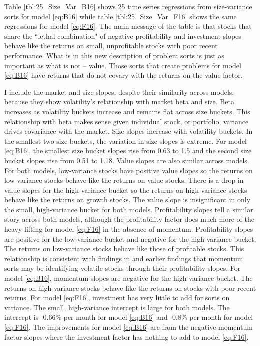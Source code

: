 
Table \ref{tbl:25_Size_Var_B16} shows 25 time series regressions from
size-variance sorts for model \ref{eq:B16} while table
\ref{tbl:25_Size_Var_F16} shows the same regressions for model \ref{eq:F16}.
The main message of the table is that stocks that share the
``lethal combination" of negative profitability and investment slopes behave
like the returns on small, unprofitable stocks with poor recent performance.
What is in this new description of problem sorts is just as important as what
is not -- value.
Those sorts that create problems for model \ref{eq:B16} have returns that do
not covary with the returns on the value factor.

I include the market and size slopes, despite their similarity across models,
because they show volatility's relationship with market beta and size.
Beta increases as volatility buckets increase and remains flat across size
buckets.
This relationship with beta makes sense given individual stock, or portfolio,
variance drives covariance with the market.
Size slopes increase with volatility buckets.
In the smallest two size buckets, the variation in size slopes is extreme.
For model \ref{eq:B16}, the smallest size bucket slopes rise from 0.63 to 1.5
and the second size bucket slopes rise from 0.51 to 1.18.
Value slopes are also similar across models.
For both models, low-variance stocks have positive value slopes so
the returns on low-variance stocks behave like the returns on value stocks.
There is a drop in value slopes for the high-variance bucket so
the returns on high-variance stocks behave like the returns on growth stocks.
The value slope is insignificant in only the small, high-variance bucket for
both models.
Profitability slopes tell a similar story across both models,
although the profitability factor does much more of the heavy lifting for model
\ref{eq:F16} in the absence of momentum.
Profitability slopes are positive for the low-variance bucket and negative for
the high-variance bucket.
The returns on low-variance stocks behave like those of profitable stocks.
This relationship is consistent with findings in
\textcite{novy2014understanding} and earlier findings that momentum sorts
may be identifying volatile stocks through their profitability slopes.
For model \ref{eq:B16}, momentum slopes are negative for the high-variance
bucket.
The returns on high-variance stocks behave like the returns on stocks with poor
recent returns. 
For model \ref{eq:F16}, investment has very little to add for sorts on
variance.
The small, high-variance intercept is large for both models.
The intercept is -0.66\% per month for model \ref{eq:B16} and -0.8\% per month
for model \ref{eq:F16}.
The improvements for model \ref{eq:B16} are from the negative momentum factor
slopes where the investment factor has nothing to add to model \ref{eq:F16}.

